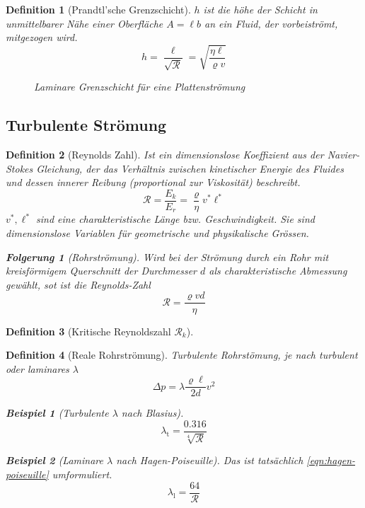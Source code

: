 \documentclass[a4paper, twocolumn]{article}
\numberwithin{equation}{section}
\theoremstyle{hsr-def}
\newtheorem{definition}{Definition}[section]
\theoremstyle{hsr-sub}
\newtheorem{result}{Folgerung}[definition]
\newtheorem{example}{Beispiel}[definition]
\begin{document}
\begin{definition}[Prandtl'sche Grenzschicht]
\(h\) ist die h\"ohe der Schicht in unmittelbarer N\"ahe einer Oberfl\"ache \(A = \ell b\) an ein Fluid, der vorbeistr\"omt, mitgezogen wird.
\[
    h = \frac{\ell}{\sqrt{\mathcal{R}}} =  \sqrt{\frac{\eta\ell}{\varrho v}}
\]
\begin{figure}[h] \centering

\caption{Laminare Grenzschicht f\"ur eine Plattenstr\"omung}
\end{figure}
\end{definition}

\subsection{Turbulente Str\"omung}

\begin{definition}[Reynolds Zahl]
Ist ein dimensionslose Koeffizient aus der \emph{Navier-Stokes} Gleichung, der das Verh\"altnis zwischen kinetischer Energie des Fluides und dessen innerer Reibung (proportional zur Viskosit\"at) beschreibt.
\[
    \mathcal{R} = \frac{E_k}{E_r} = \frac{\varrho}{\eta} v^*\ell^*
\]
\(v^*, \ell^*\) sind eine charakteristische L\"ange bzw. Geschwindigkeit. Sie sind dimensionslose Variablen f\"ur geometrische und physikalische Gr\"ossen.

\begin{result}[Rohrstr\"omung]
Wird bei der Str\"omung durch ein Rohr mit kreisf\"ormigem Querschnitt der Durchmesser \(d\) als charakteristische Abmessung gew\"ahlt, sot ist die Reynolds-Zahl
\[
    \mathcal{R} = \frac{\varrho v d}{\eta}
\]
\end{result}

\end{definition}

\begin{definition}[Kritische Reynoldszahl \(\mathcal{R}_k\)]

\end{definition}

\begin{definition}[Reale Rohrstr\"omung]
Turbulente Rohrst\"omung, je nach turbulent oder laminares \(\lambda\) 
\[
    \Delta p = \lambda \frac{\varrho\ell}{2d} v^2
\]

\begin{example}[Turbulente \(\lambda\) nach Blasius]
\[
    \lambda_\text{t} = \frac{0.316}{\sqrt[4]{\mathcal{R}}}
\]
\end{example}

\begin{example}[Laminare \(\lambda\) nach Hagen-Poiseuille]
Das ist tats\"achlich \eqref{eqn:hagen-poiseuille} umformuliert.
\[
    \lambda_\text{l} = \frac{64}{\mathcal{R}}
\]
\end{example}
\end{definition}
\end{document}
